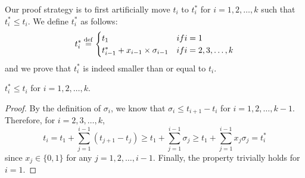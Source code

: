 Our proof strategy is to first artificially move $t_i$ to $t_i^*$ for $i=1,2,\ldots,k$ such that $t_i^*
\leq t_i$. We define $t_i^*$ as follows:
\begin{equation}
\label{eq:ti*}
t_i^* \equals
\begin{cases}
t_1 & \mbox{if } i=1 \\
t_{i-1}^*+ x_{i-1}\times\sigma_{i-1} & \mbox{if } i=2,3,\ldots,k \\
\end{cases}
\end{equation}
and we prove that $t_i^*$ is indeed smaller than or equal to $t_i$.
\begin{Lemma}
\label{lemma:ti*}
$t_i^* \leq t_i$ for $i=1,2,\ldots,k$.
\end{Lemma}
\begin{proof}
By the definition of $\sigma_i$, we know that $\sigma_i \leq t_{i+1}-t_i$ for $i=1,2,\ldots,k-1$.
Therefore,  for $i=2,3,\ldots,k$,%
\begin{equation*}
  t_i = t_1 + \sum_{j=1}^{i-1} (t_{j+1} - t_j) \geq t_1 + \sum_{j=1}^{i-1} \sigma_j \geq t_1 + \sum_{j=1}^{i-1} x_j \sigma_j = t_i^*
\end{equation*}
since $x_j \in \{0, 1\}$ for any $j=1,2,\ldots,i-1$. 
Finally, the property trivially holds for $i=1$. 
\end{proof}


 



